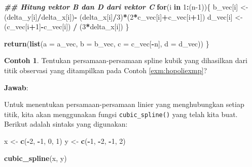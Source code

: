 \documentclass[
]{book}
\newenvironment{Shaded}{\begin{snugshade}}{\end{snugshade}}
\newcommand{\AttributeTok}[1]{\textcolor[rgb]{0.13,0.29,0.53}{#1}}
\newcommand{\ControlFlowTok}[1]{\textcolor[rgb]{0.13,0.29,0.53}{\textbf{#1}}}
\newcommand{\DecValTok}[1]{\textcolor[rgb]{0.00,0.00,0.81}{#1}}
\newcommand{\DocumentationTok}[1]{\textcolor[rgb]{0.56,0.35,0.01}{\textbf{\textit{#1}}}}
\newcommand{\FunctionTok}[1]{\textcolor[rgb]{0.13,0.29,0.53}{\textbf{#1}}}
\newcommand{\NormalTok}[1]{#1}
\newcommand{\OtherTok}[1]{\textcolor[rgb]{0.56,0.35,0.01}{#1}}
\newcommand{\SpecialCharTok}[1]{\textcolor[rgb]{0.81,0.36,0.00}{\textbf{#1}}}
\theoremstyle{definition}
\theoremstyle{definition}
\newtheorem{example}{Contoh}[chapter]
\theoremstyle{definition}
\theoremstyle{definition}
\theoremstyle{remark}
\begin{document}
\begin{Shaded}
\begin{Highlighting}[]
 \DocumentationTok{\#\# Hitung vektor B dan D dari vektor C}
 \ControlFlowTok{for}\NormalTok{(i }\ControlFlowTok{in} \DecValTok{1}\SpecialCharTok{:}\NormalTok{(n}\DecValTok{{-}1}\NormalTok{))\{}
\NormalTok{   b\_vec[i] }\OtherTok{\textless{}{-}}\NormalTok{ (delta\_y[i]}\SpecialCharTok{/}\NormalTok{delta\_x[i])}\SpecialCharTok{{-}}
\NormalTok{               (delta\_x[i]}\SpecialCharTok{/}\DecValTok{3}\NormalTok{)}\SpecialCharTok{*}\NormalTok{(}\DecValTok{2}\SpecialCharTok{*}\NormalTok{c\_vec[i]}\SpecialCharTok{+}\NormalTok{c\_vec[i}\SpecialCharTok{+}\DecValTok{1}\NormalTok{])}
\NormalTok{   d\_vec[i] }\OtherTok{\textless{}{-}}\NormalTok{ (c\_vec[i}\SpecialCharTok{+}\DecValTok{1}\NormalTok{]}\SpecialCharTok{{-}}\NormalTok{c\_vec[i]) }\SpecialCharTok{/}\NormalTok{ (}\DecValTok{3}\SpecialCharTok{*}\NormalTok{delta\_x[i])}
\NormalTok{ \}}
  
 \FunctionTok{return}\NormalTok{(}\FunctionTok{list}\NormalTok{(}\AttributeTok{a =}\NormalTok{ a\_vec, }\AttributeTok{b =}\NormalTok{ b\_vec, }\AttributeTok{c =}\NormalTok{ c\_vec[}\SpecialCharTok{{-}}\NormalTok{n], }\AttributeTok{d =}\NormalTok{ d\_vec))}
\NormalTok{\}}
\end{Highlighting}
\end{Shaded}

\begin{example}
\protect\hypertarget{exm:cubicsplineexm}{}\label{exm:cubicsplineexm}Tentukan persamaan-persamaan spline kubik yang dihasilkan dari titik observasi yang ditampilkan pada Contoh \ref{exm:hopoliexmp}?
\end{example}

\textbf{Jawab}:

Untuk menentukan persamaan-persamaan linier yang menghubungkan setiap titik, kita akan menggunakan fungsi \texttt{cubic\_spline()} yang telah kita buat. Berikut adalah sintaks yang digunakan:

\begin{Shaded}
\begin{Highlighting}[]
\NormalTok{x }\OtherTok{\textless{}{-}} \FunctionTok{c}\NormalTok{(}\SpecialCharTok{{-}}\DecValTok{2}\NormalTok{, }\SpecialCharTok{{-}}\DecValTok{1}\NormalTok{, }\DecValTok{0}\NormalTok{, }\DecValTok{1}\NormalTok{)}
\NormalTok{y }\OtherTok{\textless{}{-}} \FunctionTok{c}\NormalTok{(}\SpecialCharTok{{-}}\DecValTok{1}\NormalTok{, }\SpecialCharTok{{-}}\DecValTok{2}\NormalTok{, }\SpecialCharTok{{-}}\DecValTok{1}\NormalTok{, }\DecValTok{2}\NormalTok{)}

\FunctionTok{cubic\_spline}\NormalTok{(x, y)}
\end{Highlighting}
\end{Shaded}
\end{document}
